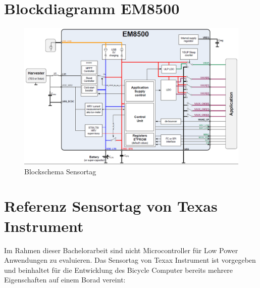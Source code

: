 
\appendix


% 
%
%
%
%



\chapter{Blockdiagramm EM8500}\label{anhang_em8500} 
\begin{figure}[h]
    \includegraphics {2TheoretischeGrundlagen/imag/blockdiagrammEm8500.png} 
     \caption{Blockschema Sensortag}
\end{figure}

\chapter{Referenz Sensortag von Texas Instrument}\label{anhang_sensortag} 
Im Rahmen dieser Bachelorarbeit sind nicht Microcontroller für Low Power Anwendungen zu evaluieren. Das Sensortag von Texax Instrument ist vorgegeben und beinhaltet für die Entwicklung des Bicycle Computer bereits mehrere Eigenschaften auf einem Borad vereint:

